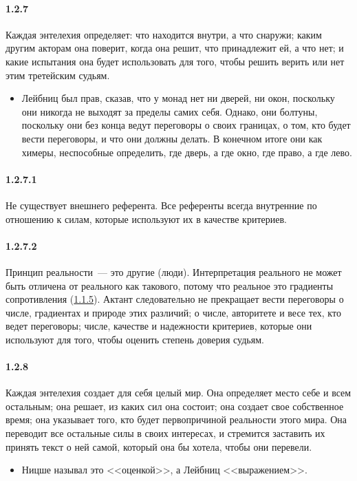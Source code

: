 \paragraph{1.2.7}\hypertarget{par:1.2.7}{} Каждая энтелехия определяет: что находится внутри, а что снаружи; каким другим акторам она поверит, когда она решит, что принадлежит ей, а что нет; и какие испытания она будет использовать для того, чтобы решить верить или нет этим третейским судьям. 
	\begin{itemize}
	\item Лейбниц был прав, сказав, что у монад нет ни дверей, ни окон, поскольку они никогда не выходят за пределы самих себя. Однако, они болтуны, поскольку они без конца ведут переговоры о своих границах, о том, кто будет вести переговоры, и что они должны делать. В конечном итоге они как химеры, неспособные определить, где дверь, а где окно, где право, а где лево.
	\end{itemize}

\paragraph{1.2.7.1}\hypertarget{par:1.2.7.1}{} Не существует внешнего референта. Все референты всегда внутренние по отношению к силам, которые используют их в качестве критериев.

\paragraph{1.2.7.2}\hypertarget{par:1.2.7.2}{} Принцип реальности~--- это другие (люди).
Интерпретация реального не может быть отличена от реального как такового, потому что реальное это градиенты сопротивления (\hyperlink{par:1.1.5}{1.1.5}). Актант следовательно не прекращает вести переговоры о числе, градиентах и природе этих различий; о числе, авторитете и весе тех, кто ведет переговоры; числе, качестве и надежности критериев, которые они используют для того, чтобы оценить степень доверия судьям.

\paragraph{1.2.8}\hypertarget{par:1.2.8}{} Каждая энтелехия создает для себя целый мир. Она определяет место себе и всем остальным; она решает, из каких сил она состоит; она создает свое собственное время; она указывает того, кто будет первопричиной реальности этого мира. Она переводит все остальные силы в своих интересах, и стремится заставить их принять текст о ней самой, который она бы хотела, чтобы они перевели.
	\begin{itemize}
	\item Ницше называл это <<оценкой>>, а Лейбниц <<выражением>>.
	\end{itemize}

